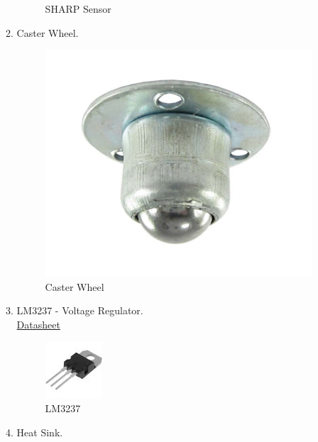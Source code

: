 \documentclass[a4paper,12pt,oneside]{book}
\begin{document}
\begin{itemize}
\begin{enumerate}
\begin{figure}[!ht]
        \caption{SHARP Sensor}
      \end{figure}
    \item Caster Wheel.
    \begin{figure}[!ht]
        \centering
        \includegraphics[scale=0.15]{caster}
        \caption{Caster Wheel}
      \end{figure}
    \item LM3237 - Voltage Regulator.\\
    \href{http://pdf.datasheetarchive.com/indexerfiles/Datasheet-044/DSA0017815.pdf}{ Datasheet}\par
   \begin{figure}[!ht]
        \centering
        \includegraphics[scale=1]{lm}
        \caption{LM3237}
      \end{figure}
    \item Heat Sink.
    \begin{figure}[!ht]
        \centering

\end{figure}
\end{enumerate}
\end{itemize}
\end{document}
